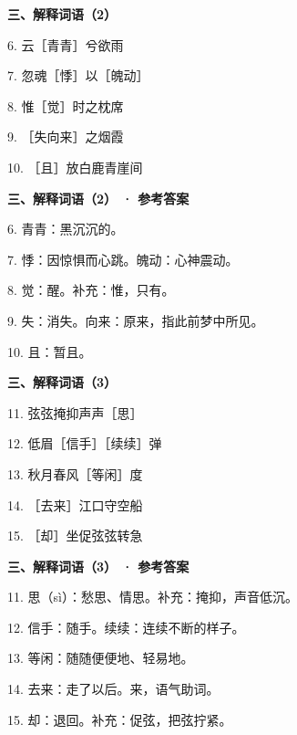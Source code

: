 \documentclass[UTF8,10pt,aspectratio=169]{ctexbeamer}
\newcommand{\PageHeading}[1]{\begin{center}{\Large\bfseries #1}\end{center}\vspace{0.2cm}}
\begin{document}
\begin{frame}
\PageHeading{三、解释词语（2）}
6. 云［青青］兮欲雨\par\vspace{0.23cm}
7. 忽魂［悸］以［魄动］\par\vspace{0.23cm}
8. 惟［觉］时之枕席\par\vspace{0.23cm}
9. ［失向来］之烟霞\par\vspace{0.23cm}
10. ［且］放白鹿青崖间\par\vspace{0.23cm}
\end{frame}
\begin{frame}
\PageHeading{三、解释词语（2） · 参考答案}
6. 青青：黑沉沉的。\par\vspace{0.23cm}
7. 悸：因惊惧而心跳。魄动：心神震动。\par\vspace{0.23cm}
8. 觉：醒。补充：惟，只有。\par\vspace{0.23cm}
9. 失：消失。向来：原来，指此前梦中所见。\par\vspace{0.23cm}
10. 且：暂且。\par\vspace{0.23cm}
\end{frame}
\begin{frame}
\PageHeading{三、解释词语（3）}
11. 弦弦掩抑声声［思］\par\vspace{0.23cm}
12. 低眉［信手］［续续］弹\par\vspace{0.23cm}
13. 秋月春风［等闲］度\par\vspace{0.23cm}
14. ［去来］江口守空船\par\vspace{0.23cm}
15. ［却］坐促弦弦转急\par\vspace{0.23cm}
\end{frame}
\begin{frame}
\PageHeading{三、解释词语（3） · 参考答案}
11. 思（sì）：愁思、情思。补充：掩抑，声音低沉。\par\vspace{0.23cm}
12. 信手：随手。续续：连续不断的样子。\par\vspace{0.23cm}
13. 等闲：随随便便地、轻易地。\par\vspace{0.23cm}
14. 去来：走了以后。来，语气助词。\par\vspace{0.23cm}
15. 却：退回。补充：促弦，把弦拧紧。\par\vspace{0.23cm}
\end{frame}
\end{document}
